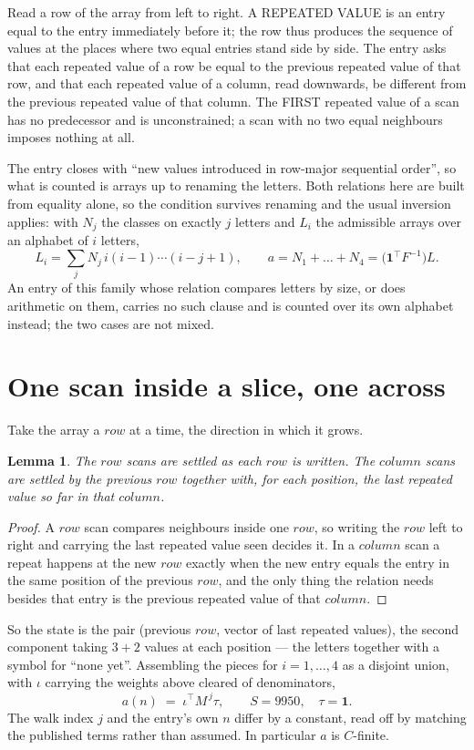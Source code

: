 \documentclass[11pt,a4paper]{article}
\theoremstyle{plain}
\newtheorem{lemma}[theorem]{Lemma}
\theoremstyle{definition}
\begin{document}
Read a row of the array from left to right. A REPEATED VALUE is an entry equal to the entry
immediately before it; the row thus produces the sequence of values at the places where two
equal entries stand side by side. The entry asks that each repeated value of a row be
equal to the previous repeated value of that row, and that each repeated value of a column,
read downwards, be different from the previous repeated value of that column. The FIRST repeated
value of a scan has no predecessor and is unconstrained; a scan with no two equal neighbours
imposes nothing at all.

The entry closes with ``new values introduced in row-major sequential order'', so what is
counted is arrays up to renaming the letters. Both relations here are built from equality
alone, so the condition survives renaming and the usual inversion applies: with $N_j$ the
classes on exactly $j$ letters and $L_i$ the admissible arrays over an alphabet of $i$ letters,
\[
L_i=\sum_j N_j\,i(i-1)\cdots(i-j+1),\qquad
a=N_1+\dots+N_{4}=\bigl(\mathbf{1}^{\!\top}F^{-1}\bigr)L .
\]
An entry of this family whose relation compares letters by size, or does arithmetic on them,
carries no such clause and is counted over its own alphabet instead; the two cases are not
mixed.

\section{One scan inside a slice, one across}

Take the array a $row$ at a time, the direction in which it grows.

\begin{lemma}\label{lem:state}
The $row$ scans are settled as each $row$ is written. The $column$ scans are
settled by the previous $row$ together with, for each position, the last repeated value
so far in that $column$.
\end{lemma}

\begin{proof}
A $row$ scan compares neighbours inside one $row$, so writing the
$row$ left to right and carrying the last repeated value seen decides it. In a
$column$ scan a repeat happens at the new $row$ exactly when the new entry equals the
entry in the same position of the previous $row$, and the only thing the relation needs
besides that entry is the previous repeated value of that $column$.
\end{proof}

So the state is the pair (previous $row$, vector of last repeated values), the second
component taking $3+2$ values at each position --- the letters together with a symbol for
``none yet''. Assembling the pieces for $i=1,\dots,4$ as a disjoint union, with $\iota$ carrying the weights above cleared of denominators,
\[
a(n)\;=\;\iota^{\!\top}M^{\,j}\tau ,\qquad S=9950,\quad\tau=\mathbf{1} .
\]
The walk index $j$ and the entry's own $n$ differ by a constant, read off by matching the
published terms rather than assumed. In particular $a$ is $C$-finite.
\end{document}
